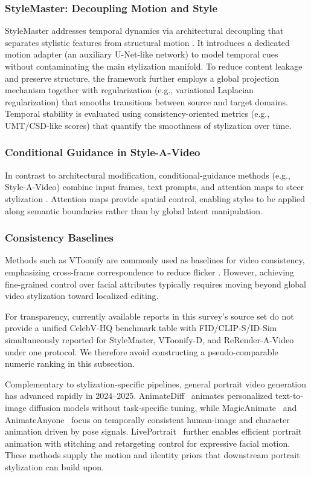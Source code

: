 \documentclass[journal]{IEEEtran}
\begin{document}
\subsubsection{StyleMaster: Decoupling Motion and Style}
\label{sec:advanced:video:stylemaster}
StyleMaster addresses temporal dynamics via architectural decoupling that separates stylistic features from structural motion \cite{ye2024stylemastersy}. It introduces a dedicated motion adapter (an auxiliary U-Net-like network) to model temporal cues without contaminating the main stylization manifold. To reduce content leakage and preserve structure, the framework further employs a global projection mechanism together with regularization (e.g., variational Laplacian regularization) that smooths transitions between source and target domains. Temporal stability is evaluated using consistency-oriented metrics (e.g., UMT/CSD-like scores) that quantify the smoothness of stylization over time.

\subsubsection{Conditional Guidance in Style-A-Video}
\label{sec:advanced:video:styleavideo}
In contrast to architectural modification, conditional-guidance methods (e.g., Style-A-Video) combine input frames, text prompts, and attention maps to steer stylization \cite{huang2023styleavideoad}. Attention maps provide spatial control, enabling styles to be applied along semantic boundaries rather than by global latent manipulation.

\subsubsection{Consistency Baselines}
\label{sec:advanced:video:baselines}
Methods such as VToonify are commonly used as baselines for video consistency, emphasizing cross-frame correspondence to reduce flicker \cite{yang2022vtoonify}. However, achieving fine-grained control over facial attributes typically requires moving beyond global video stylization toward localized editing.

For transparency, currently available reports in this survey's source set do not provide a unified CelebV-HQ benchmark table with FID/CLIP-S/ID-Sim simultaneously reported for StyleMaster, VToonify-D, and ReRender-A-Video under one protocol. We therefore avoid constructing a pseudo-comparable numeric ranking in this subsection.

Complementary to stylization-specific pipelines, general portrait video generation has advanced rapidly in 2024--2025. AnimateDiff~\cite{guo2024animatediff} animates personalized text-to-image diffusion models without task-specific tuning, while MagicAnimate~\cite{xu2024magicanimate} and AnimateAnyone~\cite{hu2024animateanyone} focus on temporally consistent human-image and character animation driven by pose signals. LivePortrait~\cite{guo2024liveportrait} further enables efficient portrait animation with stitching and retargeting control for expressive facial motion. These methods supply the motion and identity priors that downstream portrait stylization can build upon.
\end{document}

